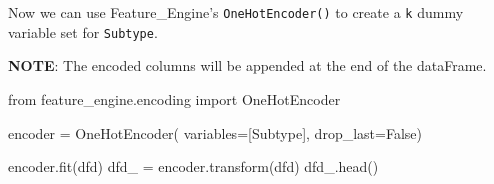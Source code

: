 \documentclass[
  letterpaper,
  DIV=11,
  numbers=noendperiod]{scrartcl}
\newenvironment{Shaded}{\begin{snugshade}}{\end{snugshade}}
\newcommand{\ImportTok}[1]{\textcolor[rgb]{0.00,0.46,0.62}{#1}}
\newcommand{\NormalTok}[1]{\textcolor[rgb]{0.00,0.23,0.31}{#1}}
\newcommand{\OperatorTok}[1]{\textcolor[rgb]{0.37,0.37,0.37}{#1}}
\newcommand{\StringTok}[1]{\textcolor[rgb]{0.13,0.47,0.30}{#1}}
\newcommand{\VariableTok}[1]{\textcolor[rgb]{0.07,0.07,0.07}{#1}}
\begin{document}
Now we can use Feature\_Engine's \texttt{OneHotEncoder()} to create a
\texttt{k} dummy variable set for \texttt{Subtype}.

\textbf{NOTE}: The encoded columns will be appended at the end of the
dataFrame.

\begin{Shaded}
\begin{Highlighting}[]
\ImportTok{from}\NormalTok{ feature\_engine.encoding }\ImportTok{import}\NormalTok{ OneHotEncoder}

\NormalTok{encoder }\OperatorTok{=}\NormalTok{ OneHotEncoder(}
\NormalTok{    variables}\OperatorTok{=}\NormalTok{[}\StringTok{\textquotesingle{}Subtype\textquotesingle{}}\NormalTok{],}
\NormalTok{    drop\_last}\OperatorTok{=}\VariableTok{False}\NormalTok{)}

\NormalTok{encoder.fit(dfd)}
\NormalTok{dfd\_ }\OperatorTok{=}\NormalTok{ encoder.transform(dfd)}
\NormalTok{dfd\_.head()}
\end{Highlighting}
\end{Shaded}
\end{document}
